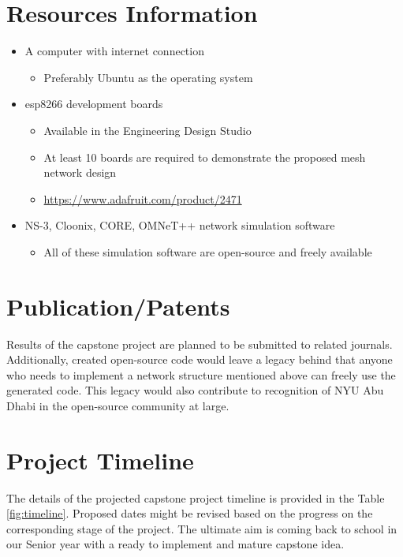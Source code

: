 \documentclass[conference]{IEEEtran}
\begin{document}
\section{Resources Information}
\begin{itemize}
    \item A computer with internet connection 
        \begin{itemize}
            \item Preferably Ubuntu as the operating system
        \end{itemize}
    \item esp8266 development boards
        \begin{itemize}
            \item Available in the Engineering Design Studio
            \item At least 10 boards are required to demonstrate the proposed mesh network design
            \item \href{https://www.adafruit.com/product/2471}{https://www.adafruit.com/product/2471}
        \end{itemize}
    \item NS-3, Cloonix, CORE, OMNeT++ network simulation software
        \begin{itemize}
            \item All of these simulation software are open-source and freely available
        \end{itemize}
\end{itemize}
\section{Publication/Patents}
\noindent Results of the capstone project are planned to be submitted to related journals. Additionally, created open-source code would leave a legacy behind that anyone who needs to implement a network structure mentioned above can freely use the generated code. This legacy would also contribute to recognition of NYU Abu Dhabi in the open-source community at large.

\section{Project Timeline}
\noindent The details of the projected capstone project timeline is provided in the Table \ref{fig:timeline}. Proposed dates might be revised based on the progress on the corresponding stage of the project. The ultimate aim is coming back to school in our Senior year with a ready to implement and mature capstone idea.
\end{document}
